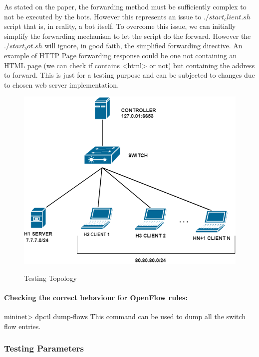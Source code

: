 As stated on the paper, the forwarding method must be sufficiently complex to not be executed by the bots. However this represents an issue to $./start_client.sh$ script that is, in reality, a bot itself. To overcome this issue, we can initially simplify the forwarding mechanism to let the script do the forward. However the $./start_bot.sh$ will ignore, in good faith, the simplified forwarding directive.
An example of HTTP Page forwarding response could be one not containing an HTML page (we can check if contains <html> or not) but containing the address to forward. This is just for a testing purpose and can be subjected to changes due to chosen web server implementation.

\begin{figure}[H]
\begin{center}
\includegraphics[]{images/TestingTopology.png}
\label{fig:testing}
\caption{Testing Topology}
\end{center}
\end{figure}

\paragraph{Checking the correct behaviour for OpenFlow rules:} 
mininet> dpctl dump-flows
This command can be used to dump all the switch flow entries.

\subsubsection{Testing Parameters}


